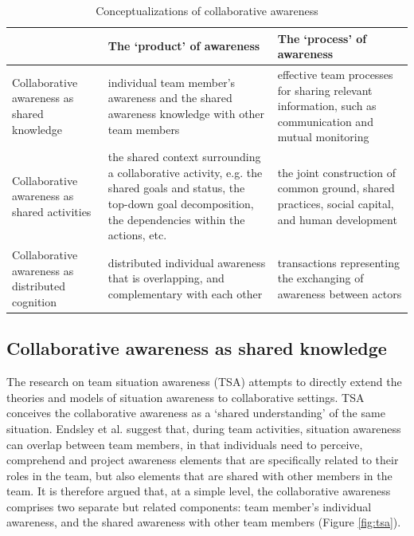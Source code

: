 \begin{table}[htbp]
\centering
\footnotesize
\begin{tabular}{>{\raggedright}p{1.1in}>{\raggedright}p{2.2in}>{\raggedright}p{2.2in}}
   \toprule 
    & \textbf{The `product' of awareness} & \textbf{The `process' of awareness}\tabularnewline
   \midrule 
   Collaborative awareness as shared knowledge & individual team member\textquoteright{}s awareness and the shared
   awareness knowledge with other team members & effective team processes for sharing relevant information, such as
   communication and mutual monitoring\tabularnewline
   \midrule 
   Collaborative awareness as shared activities & the shared context surrounding a collaborative activity, e.g. the shared
   goals and status, the top-down goal decomposition, the dependencies
   within the actions, etc. & the joint construction of common ground, shared practices, social
   capital, and human development\tabularnewline
   \midrule 
   Collaborative awareness as distributed cognition & distributed individual awareness that is overlapping, and complementary
   with each other & transactions representing the exchanging of awareness between actors\tabularnewline
   \bottomrule
\end{tabular}  
\caption{Conceptualizations of collaborative awareness}
\label{tab:collaborative_awareness}
\end{table}



\subsection{Collaborative awareness as shared knowledge} %
\label{sub:team_situation_awareness}
The research on team situation awareness (TSA) attempts to directly extend the theories and models of situation awareness to collaborative settings. TSA conceives the collaborative awareness as a `shared understanding' of the same situation. Endsley et al. \cite{endsley2001model} suggest that, during team activities, situation awareness can overlap between team members, in that individuals need to perceive, comprehend and project awareness elements that are specifically related to their roles in the team, but also elements that are shared with other members in the team. It is therefore argued that, at a simple level, the collaborative awareness comprises two separate but related components: team member's individual awareness, and the shared awareness with other team members (Figure \ref{fig:tsa}). 

